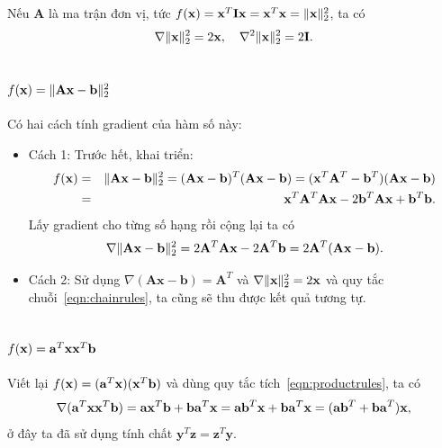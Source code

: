Nếu $\mathbf{A}$ là ma trận đơn vị, tức $f(\mathbf{x}) = \mathbf{x}^T\mathbf{Ix} = \mathbf{x}^T\mathbf{x} = \|\mathbf{x}\|_2^2$, ta có
\begin{equation}
\nabla \|\mathbf{x}\|_2^2 = 2\mathbf{x},~~~
\nabla^2 \|\mathbf{x}\|_2^2 = 2\mathbf{I}.
\end{equation}


\subsection{$f(\mathbf{x}) = \|\mathbf{Ax} - \mathbf{b}\|_2^2 $}
\label{sec:gr_squarenorm2}
Có hai cách tính gradient của hàm số này:
\begin{itemize}
\item {Cách 1:} Trước hết, khai triển:
\begin{eqnarray}
\nonumber
f(\mathbf{x}) &=& \|\mathbf{Ax} - \mathbf{b}\|_2^2 = (\mathbf{Ax} - \mathbf{b})^T(\mathbf{Ax} - \mathbf{b}) = (\mathbf{x}^T\mathbf{A}^T - \mathbf{b}^T) (\mathbf{Ax} - \mathbf{b}) \\\ \nonumber
&=& \mathbf{x}^T\mathbf{A}^T\mathbf{Ax} - 2 \mathbf{b}^T\mathbf{Ax} + \mathbf{b}^T\mathbf{b}.
\end{eqnarray}
Lấy gradient cho từng số hạng rồi cộng lại ta có
\begin{equation*}
\nabla \|\mathbf{Ax} - \mathbf{b}\|_2^2 = 2\mathbf{A}^T\mathbf{A}\mathbf{x} - 2\mathbf{A}^T\mathbf{b} = 2\mathbf{A}^T(\mathbf{Ax} - \mathbf{b}).
\end{equation*}

\item {Cách 2:} Sử dụng $\nabla (\mathbf{Ax} - \mathbf{b}) =
\mathbf{A}^T$ và $\nabla \|\mathbf{x}\|_2^2 = 2\mathbf{x}$ và quy tắc chuỗi~\eqref{eqn:chainrules}, ta cũng sẽ thu được kết quả tương tự.
\end{itemize}

\subsection{$f(\mathbf{x}) = \mathbf{a}^T\mathbf{x}\mathbf{x}^T\mathbf{b}$}
Viết lại $f(\mathbf{x}) = (\mathbf{a}^T\mathbf{x})(\mathbf{x}^T\mathbf{b})$ và dùng
quy tắc tích~\eqref{eqn:productrules}, ta có
\begin{equation*}
\nabla (\mathbf{a}^T\mathbf{x}\mathbf{x}^T\mathbf{b}) = \mathbf{a} \mathbf{x}^T\mathbf{b} +
\mathbf{b}\mathbf{a}^T\mathbf{x} = \mathbf{ab}^T\mathbf{x} + \mathbf{b}\mathbf{a}^T\mathbf{x}=
(\mathbf{ab}^T + \mathbf{ba}^T)\mathbf{x},
\end{equation*}
ở đây ta đã sử dụng tính chất $\mathbf{y}^T\mathbf{z} = \mathbf{z}^T\mathbf{y}$.

